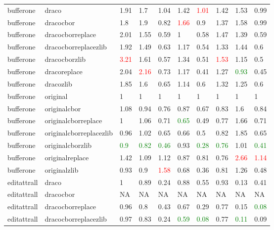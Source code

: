 \begin{landscape}
\begin{longtable}{llllllllll}
bufferone & draco & 1.91 & 1.7 & 1.04 & 1.42 & \textcolor{red}{1.01} & 1.42 & 1.53 & 0.99\\
bufferone & dracocbor & 1.8 & 1.9 & 0.82 & \textcolor{red}{1.66} & 0.9 & 1.37 & 1.58 & 0.99\\
bufferone & dracocborreplace & 2.01 & 1.55 & 0.59 & 1 & 0.58 & 1.47 & 1.39 & 0.59\\
bufferone & dracocborreplacezlib & 1.92 & 1.49 & 0.63 & 1.17 & 0.54 & 1.33 & 1.44 & 0.6\\
bufferone & dracocborzlib & \textcolor{red}{3.21} & 1.61 & 0.57 & 1.34 & 0.51 & \textcolor{red}{1.53} & 1.15 & 0.5\\
bufferone & dracoreplace & 2.04 & \textcolor{red}{2.16} & 0.73 & 1.17 & 0.41 & 1.27 & \textcolor{green}{0.93} & 0.45\\
bufferone & dracozlib & 1.85 & 1.6 & 0.65 & 1.14 & 0.6 & 1.32 & 1.25 & 0.6\\
bufferone & original & 1 & 1 & 1 & 1 & 1 & 1 & 1 & 1\\
bufferone & originalcbor & 1.08 & 0.94 & 0.76 & 0.87 & 0.67 & 0.83 & 1.6 & 0.84\\
bufferone & originalcborreplace & 1 & 1.06 & 0.71 & \textcolor{green}{0.65} & 0.49 & 0.77 & 1.66 & 0.71\\
bufferone & originalcborreplacezlib & 0.96 & 1.02 & 0.65 & 0.66 & 0.5 & 0.82 & 1.85 & 0.65\\
bufferone & originalcborzlib & \textcolor{green}{0.9} & \textcolor{green}{0.82} & \textcolor{green}{0.46} & 0.93 & \textcolor{green}{0.28} & \textcolor{green}{0.76} & 1.01 & \textcolor{green}{0.41}\\
\rowcolor{lightgray}  bufferone & originalreplace & 1.42 & 1.09 & 1.12 & 0.87 & 0.81 & 0.76 & \textcolor{red}{2.66} & \textcolor{red}{1.14}\\
\rowcolor{lightgray}  bufferone & originalzlib & 0.93 & 0.9 & \textcolor{red}{1.58} & 0.68 & 0.36 & 0.81 & 1.26 & 0.48\\
\rowcolor{lightgray}  editattrall & draco & 1 & 0.89 & 0.24 & 0.88 & 0.55 & 0.93 & 0.13 & 0.41\\
\rowcolor{lightgray}  editattrall & dracocbor & NA & NA & NA & NA & NA & NA & NA & NA\\
\rowcolor{lightgray}  editattrall & dracocborreplace & 0.96 & 0.8 & 0.43 & 0.67 & 0.29 & 0.77 & 0.15 & \textcolor{green}{0.08}\\
\rowcolor{lightgray}  editattrall & dracocborreplacezlib & 0.97 & 0.83 & 0.24 & \textcolor{green}{0.59} & \textcolor{green}{0.08} & 0.77 & \textcolor{green}{0.11} & 0.09\\

\end{longtable}
\end{landscape}
